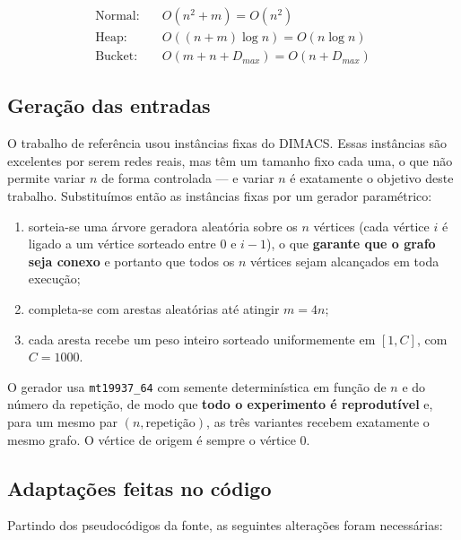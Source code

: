 \documentclass[12pt,a4paper]{article}
\begin{document}
\begin{align*}
\text{Normal:} \quad & O(n^2 + m) = O(n^2) \\
\text{Heap:}   \quad & O((n+m)\log n) = O(n \log n) \\
\text{Bucket:} \quad & O(m + n + D_{max}) = O(n + D_{max})
\end{align*}

\subsection{Geração das entradas}

O trabalho de referência usou instâncias fixas do DIMACS. Essas instâncias são
excelentes por serem redes reais, mas têm um tamanho fixo cada uma, o que não
permite variar $n$ de forma controlada --- e variar $n$ é exatamente o
objetivo deste trabalho. Substituímos então as instâncias fixas por um gerador
paramétrico:

\begin{enumerate}
  \item sorteia-se uma árvore geradora aleatória sobre os $n$ vértices
        (cada vértice $i$ é ligado a um vértice sorteado entre $0$ e $i-1$),
        o que \textbf{garante que o grafo seja conexo} e portanto que todos os
        $n$ vértices sejam alcançados em toda execução;
  \item completa-se com arestas aleatórias até atingir $m = 4n$;
  \item cada aresta recebe um peso inteiro sorteado uniformemente em
        $[1, C]$, com $C = 1000$.
\end{enumerate}

O gerador usa \texttt{mt19937\_64} com semente determinística em função de $n$
e do número da repetição, de modo que \textbf{todo o experimento é
reprodutível} e, para um mesmo par $(n, \text{repetição})$, as três variantes
recebem exatamente o mesmo grafo. O vértice de origem é sempre o vértice $0$.

\subsection{Adaptações feitas no código}

Partindo dos pseudocódigos da fonte, as seguintes alterações foram
necessárias:
\end{document}
